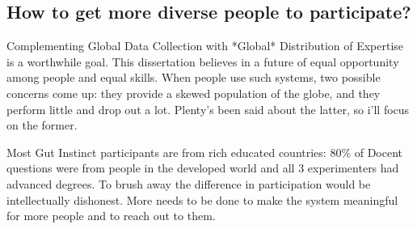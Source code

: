 

%
%

\subsection{How to get more diverse people to participate?}

Complementing Global Data Collection with *Global* Distribution of Expertise is a worthwhile goal. This dissertation believes in a future of equal opportunity among people and equal skills. When people use such systems, two possible concerns come up: they provide a skewed population of the globe, and they perform little and drop out a lot. Plenty's been said about the latter, so i'll focus on the former.

Most Gut Instinct participants are from rich educated countries: 80\% of Docent questions were from people in the developed world and all 3 experimenters had advanced degrees. To brush away the difference in participation would be intellectually dishonest. More needs to be done to make the system meaningful for more people and to reach out to them. 

